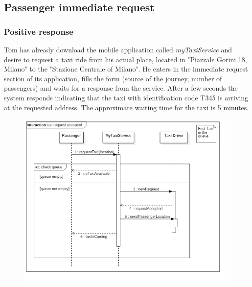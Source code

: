 \subsection{Passenger immediate request}
\subsubsection{Positive response}
Tom has already download the mobile application called \textit{myTaxiService} and desire to request a taxi ride from his actual place, located in "Piazzale Gorini 18, Milano" to the "Stazione Centrale of Milano". He enters in the immediate request section of its application, fills the form (source of the journey, number of passengers) and waits for a response from the service.
After a few seconds the system responds indicating that the taxi with identification code T345 is arriving at the requested address. The approximate waiting time for the taxi is 5 minutes.

\begin{figure}[H]
\centering
\includegraphics[scale=0.6]{Images/sequence_taxi_request_accepted}
\end{figure}

